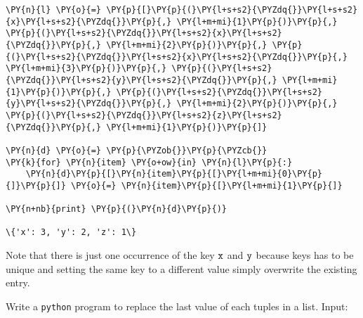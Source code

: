\begin{Answer}
\begin{tcolorbox}[size=fbox, boxrule=1pt, colback=cellbackground, colframe=cellborder]
\begin{Verbatim}[commandchars=\\\{\}]
\PY{n}{l} \PY{o}{=} \PY{p}{[}\PY{p}{(}\PY{l+s+s2}{\PYZdq{}}\PY{l+s+s2}{x}\PY{l+s+s2}{\PYZdq{}}\PY{p}{,} \PY{l+m+mi}{1}\PY{p}{)}\PY{p}{,} \PY{p}{(}\PY{l+s+s2}{\PYZdq{}}\PY{l+s+s2}{x}\PY{l+s+s2}{\PYZdq{}}\PY{p}{,} \PY{l+m+mi}{2}\PY{p}{)}\PY{p}{,} \PY{p}{(}\PY{l+s+s2}{\PYZdq{}}\PY{l+s+s2}{x}\PY{l+s+s2}{\PYZdq{}}\PY{p}{,} \PY{l+m+mi}{3}\PY{p}{)}\PY{p}{,} \PY{p}{(}\PY{l+s+s2}{\PYZdq{}}\PY{l+s+s2}{y}\PY{l+s+s2}{\PYZdq{}}\PY{p}{,} \PY{l+m+mi}{1}\PY{p}{)}\PY{p}{,} \PY{p}{(}\PY{l+s+s2}{\PYZdq{}}\PY{l+s+s2}{y}\PY{l+s+s2}{\PYZdq{}}\PY{p}{,} \PY{l+m+mi}{2}\PY{p}{)}\PY{p}{,} \PY{p}{(}\PY{l+s+s2}{\PYZdq{}}\PY{l+s+s2}{z}\PY{l+s+s2}{\PYZdq{}}\PY{p}{,} \PY{l+m+mi}{1}\PY{p}{)}\PY{p}{]}

\PY{n}{d} \PY{o}{=} \PY{p}{\PYZob{}}\PY{p}{\PYZcb{}}
\PY{k}{for} \PY{n}{item} \PY{o+ow}{in} \PY{n}{l}\PY{p}{:}
    \PY{n}{d}\PY{p}{[}\PY{n}{item}\PY{p}{[}\PY{l+m+mi}{0}\PY{p}{]}\PY{p}{]} \PY{o}{=} \PY{n}{item}\PY{p}{[}\PY{l+m+mi}{1}\PY{p}{]}
    
\PY{n+nb}{print} \PY{p}{(}\PY{n}{d}\PY{p}{)}

\{'x': 3, 'y': 2, 'z': 1\}
\end{Verbatim}
\end{tcolorbox}

Note that there is just one occurrence of the key $\tt{x}$ and $\tt{y}$ because keys has to be unique and setting the same key to a different value simply overwrite the existing entry.
\end{Answer}

\begin{Exercise}
Write a \texttt{python} program to replace the last value of each tuples in a list.
Input:
\begin{Shaded}
\begin{Highlighting}[]
\OperatorTok{=}\NormalTok{ [(}\NormalTok{, }\NormalTok{, }\NormalTok{), (}\NormalTok{, }\NormalTok{, }\NormalTok{), (}\NormalTok{, }\NormalTok{, }\NormalTok{)]}
\end{Highlighting}
\end{Shaded}
\end{Exercise}

